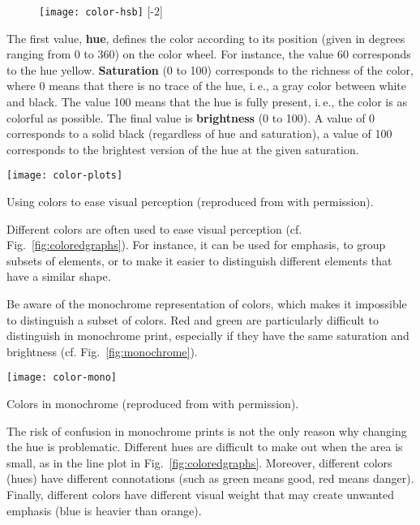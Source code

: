 \begin{figure}
\centering
\texttt{[image: color-hsb]}
[-2\baselineskip]
\end{figure}

The first value, \textbf{hue}, defines the color according to its position (given in degrees ranging from 0 to 360) on the color wheel. For instance, the value 60 corresponds to the hue yellow. \textbf{Saturation} (0 to 100) corresponds to the richness of the color, where 0 means that there is no trace of the hue, i.\,e., a gray color between white and black. The value 100 means that the hue is fully present, i.\,e., the color is as colorful as possible. The final value is \textbf{brightness} (0 to 100). A value of 0 corresponds to a solid black (regardless of hue and saturation), a value of 100 corresponds to the brightest version of the hue at the given saturation.

\begin{marginfigure}
\centering
\texttt{[image: color-plots]}
\caption{\label{fig:coloredgraphs} Using colors to ease visual perception (reproduced from \cite{Carter12} with permission).}%
\end{marginfigure}

Different colors are often used to ease visual perception (cf. Fig.~\ref{fig:coloredgraphs}). For instance, it can be used for emphasis, to group subsets of elements, or to make it easier to distinguish different elements that have a similar shape.

Be aware of the monochrome representation of colors, which makes it impossible to distinguish a subset of colors. Red and green are particularly difficult to distinguish in monochrome print, especially if they have the same saturation and brightness (cf. Fig.~\ref{fig:monochrome}).

\begin{marginfigure}[-5\baselineskip]
\centering
\texttt{[image: color-mono]}
\caption{\label{fig:monochrome} Colors in monochrome (reproduced from \cite{Carter12} with permission).}
\end{marginfigure}

The risk of confusion in monochrome prints is not the only reason why changing the hue is problematic. Different hues are difficult to make out when the area is small, as in the line plot in  Fig.~\ref{fig:coloredgraphs}. Moreover, different colors (hues) have different connotations (such as green means good, red means danger). Finally, different colors have different visual weight that may create unwanted emphasis (blue is heavier than orange).

